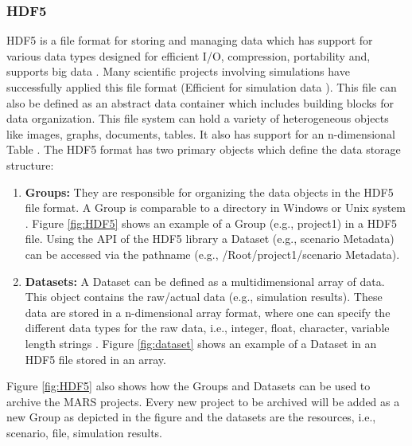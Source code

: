 \subsubsection{HDF5}
HDF5 is a file format for storing and managing data which has support for various data types designed for
efficient I/O, compression, portability and, supports big data \cite{HDF5}. Many scientific projects involving simulations have successfully applied this 
file format (Efficient
for simulation data \cite[p.~11]{Savic2007}). This file can also be defined as an abstract data container which includes building blocks for data organization. 
This file system can hold a variety of heterogeneous objects like images, graphs, documents, tables. It also has support for an n-dimensional Table \cite[p.~2]{HDF5}. 
The HDF5 format has two primary objects which define the data storage structure:
\begin{enumerate}
    \item \textbf{Groups:}  They are responsible for organizing the data objects in the HDF5 file format. A Group is comparable to a directory 
    in Windows or Unix system \cite{HDF5}. Figure \ref{fig:HDF5} shows an example of a Group (e.g., project1) in a HDF5 file. Using the API of the HDF5 library a Dataset 
    (e.g., scenario Metadata) can be accessed via the pathname (e.g., /Root/project1/scenario Metadata).
    \item \textbf{Datasets:} A Dataset can be defined as a multidimensional array of data. This object contains the raw/actual data (e.g., simulation results).
    These data are stored in a n-dimensional array format, where 
    one can specify the different data types for the raw data, i.e., integer, float, character, variable length strings \cite{HDF5}. Figure \ref{fig:dataset} shows
    an example of a Dataset in an HDF5 file stored in an array.
\end{enumerate}

Figure \ref{fig:HDF5} also shows how the Groups and Datasets can be used to archive the MARS projects. Every new project to be archived will be added as a new Group
as depicted in the figure and the datasets are the resources, i.e., scenario, file, simulation results. 

